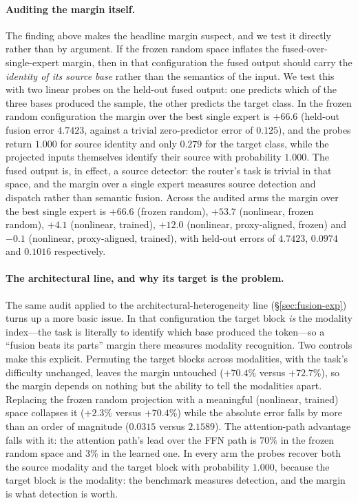 \documentclass[10pt]{article}
\theoremstyle{definition}
\theoremstyle{plain}
\theoremstyle{remark}
\begin{document}
\paragraph{Auditing the margin itself.}
The finding above makes the headline margin suspect, and we test it directly rather than by
argument. If the frozen random space inflates the fused-over-single-expert margin, then in that
configuration the fused output should carry the \emph{identity of its source base} rather than the
semantics of the input. We test this with two linear probes on the held-out fused output: one
predicts which of the three bases produced the sample, the other predicts the target class. In the
frozen random configuration the margin over the best single expert is $+66.6$ (held-out fusion
error $4.7423$, against a trivial zero-predictor error of $0.125$), and the probes return
$1.000$ for source identity and only $0.279$ for the target class, while the projected inputs
themselves identify their source with probability $1.000$. The fused output is, in effect, a
source detector: the router's task is trivial in that space, and the margin over a single expert
measures source detection and dispatch rather than semantic fusion. Across the audited arms the
margin over the best single expert is $+66.6$ (frozen random), $+53.7$ (nonlinear, frozen
random), $+4.1$ (nonlinear, trained), $+12.0$ (nonlinear, proxy-aligned, frozen) and
$-0.1$ (nonlinear, proxy-aligned, trained), with held-out errors of $4.7423$, $0.0974$ and
$0.1016$ respectively.

\paragraph{The architectural line, and why its target is the problem.} The same audit applied to the architectural-heterogeneity line (\S\ref{sec:fusion-exp}) turns up a more basic issue. In that configuration the target block \emph{is} the modality index---the task is literally to identify which base produced the token---so a ``fusion beats its parts'' margin there measures modality recognition. Two controls make this explicit. Permuting the target blocks across modalities, with the task's difficulty unchanged, leaves the margin untouched ($+70.4\%$ versus $+72.7\%$), so the margin depends on nothing but the ability to tell the modalities apart. Replacing the frozen random projection with a meaningful (nonlinear, trained) space collapses it ($+2.3\%$ versus $+70.4\%$) while the absolute error falls by more than an order of magnitude ($0.0315$ versus $2.1589$). The attention-path advantage falls with it: the attention path's lead over the FFN path is $70\%$ in the frozen random space and $3\%$ in the learned one. In every arm the probes recover both the source modality and the target block with probability $1.000$, because the target block is the modality: the benchmark measures detection, and the margin is what detection is worth.
\end{document}
